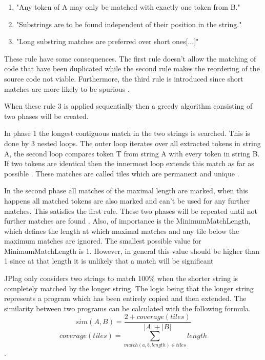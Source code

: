 \documentclass[a4paper, 11pt]{article}
\renewcommand{\\}{\vspace*{0.5\baselineskip} \newline}
\begin{document}
\begin{enumerate}
	\item "Any token of A may only be matched with exactly one token from B."
	\item "Substrings are to be found independent of their position in the string."
	\item "Long substring matches are preferred over short ones[...]"
\end{enumerate}\autocite[p. 11]{JPlagP}

These rule have some consequences. The first rule doesn't allow the matching of code that have been duplicated while
the second rule makes the reordering of the source code not viable. Furthermore, the third rule is introduced since
short matches are more likely to be spurious \autocite[p. 11]{JPlagP}.

When these rule 3 is applied sequentially then a greedy algorithm consisting of two phases will be created.

In phase 1 the longest contiguous match in the two strings is searched. This is done by 3 nested loops. The outer loop iterates over all extracted
tokens in string A, the second loop compares token T from string A with every token in string B. If two tokens are identical then the innermost loop
extends this match as far as possible \autocite[p. 11]{JPlagP}. These matches are called tiles which are permanent and unique \autocite[p. 3]{GST}.

In the second phase all matches of the maximal length are marked, when this happens all matched tokens are also marked and can't be used for any
further matches. This satisfies the first rule. These two phases will be repeated until not further matches are found \autocite[p. 11]{JPlagP}.
Also, of importance is the MinimumMatchLength, which defines the length at which maximal matches and any tile below the maximum matches are ignored.
The smallest possible value for MinimumMatchLength is 1. However, in general this value should be higher than 1 since at that length it is unlikely
that a match will be significant \autocite[p. 3]{GST}

JPlag only considers two strings to match 100\% when the shorter string is completely matched by the longer string. The logic being that the longer string
represents a program which has been entirely copied and then extended. 
The similarity between two programs can be calculated with the following formula.
\[
	sim(A,B) = \frac{2+coverage(tiles)}{|A|+|B|}
\]
\[
	coverage(tiles) = \sum_{match(a,b,length)\in tiles} length
\]
\autocite[p. 13]{JPlagP}.
\end{document}
